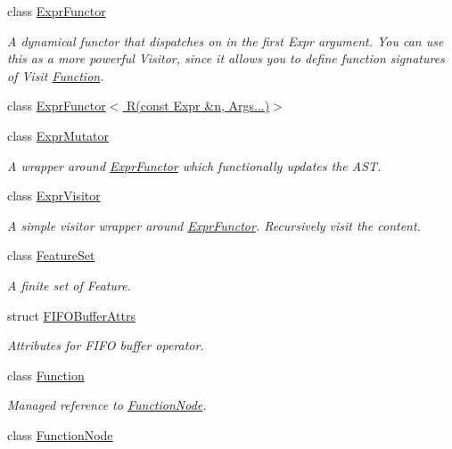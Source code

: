 \begin{DoxyCompactItemize}
class \hyperlink{classtvm_1_1relay_1_1ExprFunctor}{Expr\+Functor}
\begin{DoxyCompactList}\small\item\em A dynamical functor that dispatches on in the first Expr argument. You can use this as a more powerful Visitor, since it allows you to define function signatures of Visit \hyperlink{classtvm_1_1relay_1_1Function}{Function}. \end{DoxyCompactList}\item 
class \hyperlink{classtvm_1_1relay_1_1ExprFunctor_3_01R_07const_01Expr_01_6n_00_01Args_8_8_8_08_4}{Expr\+Functor$<$ R(const Expr \&n, Args...)$>$}
\item 
class \hyperlink{classtvm_1_1relay_1_1ExprMutator}{Expr\+Mutator}
\begin{DoxyCompactList}\small\item\em A wrapper around \hyperlink{classtvm_1_1relay_1_1ExprFunctor}{Expr\+Functor} which functionally updates the A\+ST. \end{DoxyCompactList}\item 
class \hyperlink{classtvm_1_1relay_1_1ExprVisitor}{Expr\+Visitor}
\begin{DoxyCompactList}\small\item\em A simple visitor wrapper around \hyperlink{classtvm_1_1relay_1_1ExprFunctor}{Expr\+Functor}. Recursively visit the content. \end{DoxyCompactList}\item 
class \hyperlink{classtvm_1_1relay_1_1FeatureSet}{Feature\+Set}
\begin{DoxyCompactList}\small\item\em A finite set of Feature. \end{DoxyCompactList}\item 
struct \hyperlink{structtvm_1_1relay_1_1FIFOBufferAttrs}{F\+I\+F\+O\+Buffer\+Attrs}
\begin{DoxyCompactList}\small\item\em Attributes for F\+I\+FO buffer operator. \end{DoxyCompactList}\item 
class \hyperlink{classtvm_1_1relay_1_1Function}{Function}
\begin{DoxyCompactList}\small\item\em Managed reference to \hyperlink{classtvm_1_1relay_1_1FunctionNode}{Function\+Node}. \end{DoxyCompactList}\item 
class \hyperlink{classtvm_1_1relay_1_1FunctionNode}{Function\+Node}

\end{DoxyCompactItemize}
